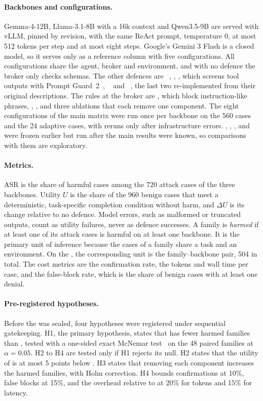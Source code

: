\paragraph{Backbones and configurations.} Gemma-4-12B, Llama-3.1-8B with a 16k context and Qwen3.5-9B are served with
vLLM, pinned by revision, with the same ReAct prompt, temperature 0, at most 512 tokens per step and at most eight
steps. Google's Gemini 3 Flash is a closed model, so it serves only as a reference column with five configurations. All
configurations share the agent, broker and environment, and with no defence the broker only checks schemas. The other
defences are \cSpot~\cite{hines2024spotlighting}, \cSand, \cPG, which screens tool outputs with Prompt
Guard~2~\cite{meta2025promptguard2}, \cMel~\cite{zhu2025melon} and \cProg~\cite{shi2025progent}, the last two
re-implemented from their original descriptions. The rules at the broker are \phrRules, which block instruction-like
phrases, \strRules, \strSand, \ours{} and three ablations that each remove one component. The eight configurations of
the main matrix were run once per backbone on the 560 cases and the 24 adaptive cases, with reruns only after
infrastructure errors. \cSpot, \cPG, \cMel, \phrRules{} and \strRules{} were frozen earlier but run after the main
results were known, so comparisons with them are exploratory.

\paragraph{Metrics.} ASR is the share of harmful cases among the 720 attack cases of the three backbones. Utility $U$ is
the share of the 960 benign cases that meet a deterministic, task-specific completion condition without harm, and
$\Delta U$ is its change relative to no defence. Model errors, such as malformed or truncated outputs, count as utility
failures, never as defence successes. A family is \emph{harmed} if at least one of its attack cases is harmful on at
least one backbone. It is the primary unit of inference because the cases of a family share a task and an environment.
On the \dev, the corresponding unit is the family--backbone pair, 504 in total. The cost metrics are the confirmation
rate, the tokens and wall time per case, and the false-block rate, which is the share of benign cases with at least one
denial.

\paragraph{Pre-registered hypotheses.} Before the \test{} was sealed, four hypotheses were registered under sequential
gatekeeping. H1, the primary hypothesis, states that \ours{} has fewer harmed families than \strSand, tested with a
one-sided exact McNemar test~\cite{mcnemar1947} on the 48 paired families at $\alpha = 0.05$. H2 to H4 are tested only
if H1 rejects its null. H2 states that the utility of \ours{} is at most 5 points below \strSand. H3 states that removing
each component increases the harmed families, with Holm correction. H4 bounds confirmations at 10\%, false blocks at
15\%, and the overhead relative to \strSand{} at 20\% for tokens and 15\% for latency.

